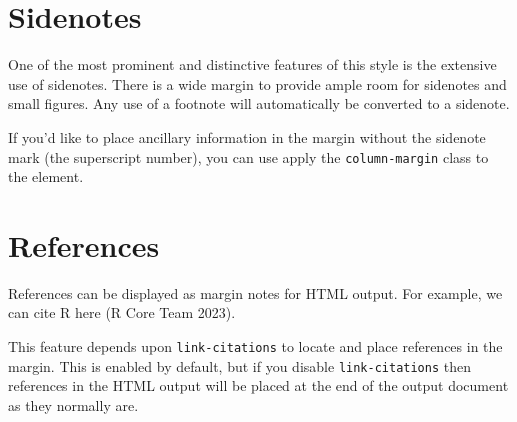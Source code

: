 \documentclass[
  letterpaper,
  DIV=11,
  numbers=noendperiod,
  oneside]{scrartcl}
\begin{document}
\hypertarget{sidenotes}{%
\section{Sidenotes}\label{sidenotes}}

One of the most prominent and distinctive features of this style is the
extensive use of sidenotes. There is a wide margin to provide ample room
for sidenotes and small figures. Any use of a footnote will
automatically be converted to a sidenote.

{} If you'd like to place ancillary
information in the margin without the sidenote mark (the superscript
number), you can use apply the \texttt{column-margin} class to the
element.

\hypertarget{references}{%
\section{References}\label{references}}

References can be displayed as margin notes for HTML output. For
example, we can cite R here (R Core Team
2023).

\begin{tcolorbox}[enhanced jigsaw, leftrule=.75mm, rightrule=.15mm, colframe=quarto-callout-note-color-frame, breakable, left=2mm, colback=white, bottomrule=.15mm, toprule=.15mm, opacityback=0, arc=.35mm]
\begin{minipage}[t]{5.5mm}
\textcolor{quarto-callout-note-color}{\faInfo}
\end{minipage}%
\begin{minipage}[t]{\textwidth - 5.5mm}

This feature depends upon \texttt{link-citations} to locate and place
references in the margin. This is enabled by default, but if you disable
\texttt{link-citations} then references in the HTML output will be
placed at the end of the output document as they normally are.

\end{minipage}%
\end{tcolorbox}
\end{document}

